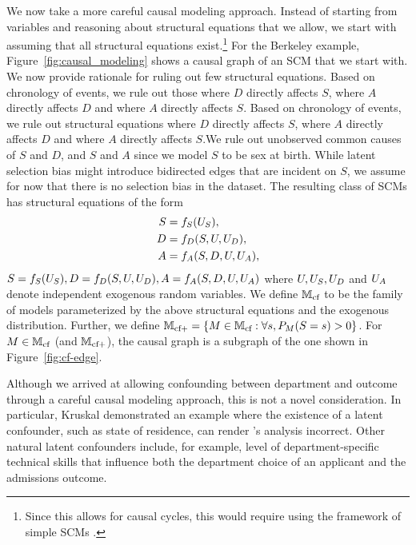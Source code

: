 We now take a more careful causal modeling approach. Instead of starting from variables and reasoning about structural equations that we allow, we start with assuming that all structural equations exist.\footnote{Since this allows for causal cycles, this would require using the framework of simple SCMs \citep{BongersFPM21}.} For the Berkeley example, Figure~\ref{fig:causal_modeling} shows a causal graph of an SCM that we start with. \ifdefined\SINGLE We now provide rationale for ruling out few structural equations. Based on chronology of events, we rule out those where $D$ directly affects $S$, where $A$ directly affects $D$ and where $A$ directly affects $S$. \else Based on chronology of events, we rule out structural equations where $D$ directly affects $S$, where $A$ directly affects $D$ and where $A$ directly affects $S$.\fi We rule out unobserved common causes of $S$ and $D$, and $S$ and $A$ since we model $S$ to be sex at birth. While latent selection bias might introduce bidirected edges \citep{ChenZM24} that are incident on $S$, we assume for now that there is no selection bias in the dataset. The resulting class of SCMs has structural equations of the form
\ifdefined\SINGLE
\begin{align}\label{eq:cf-edge}
    S &= f_{S}(U_{S}) \nonumber, \\
    D &= f_{D}(S,U, U_{D}), \\
    A &= f_{A}(S,D,U,U_{A}), \nonumber
\end{align}
\else 
$S = f_{S}(U_{S}), D = f_{D}(S,U, U_{D}), A = f_{A}(S,D,U,U_{A})$
\fi 
where $U,U_{S},U_{D}$ and $U_{A}$ denote independent exogenous random variables. 
We define $\mathbb{M}_{\text{cf}}$ to be the family of models parameterized by the above structural equations and the exogenous distribution. Further, we define $\mathbb{M}_{\text{cf}+} = \left\{ M \in \mathbb{M}_{\text{cf}} : \forall s, P_{M}(S=s) > 0 \right\}$. For $M \in \mathbb{M}_{\text{cf}}$ (and $\mathbb{M}_{\text{cf}+}$), the causal graph is a subgraph of the one shown in Figure~\ref{fig:cf-edge}. 

Although we arrived at allowing confounding between department and outcome through a careful causal modeling approach, this is not a novel consideration. In particular, Kruskal \citep[Pg 128-129]{FairleyMosteller77} demonstrated an example where the existence of a latent confounder, such as state of residence, can render \citet{BickelHO75}'s analysis incorrect. Other natural latent confounders include, for example, level of department-specific technical skills that influence both the department choice of an applicant and the admissions outcome. 

